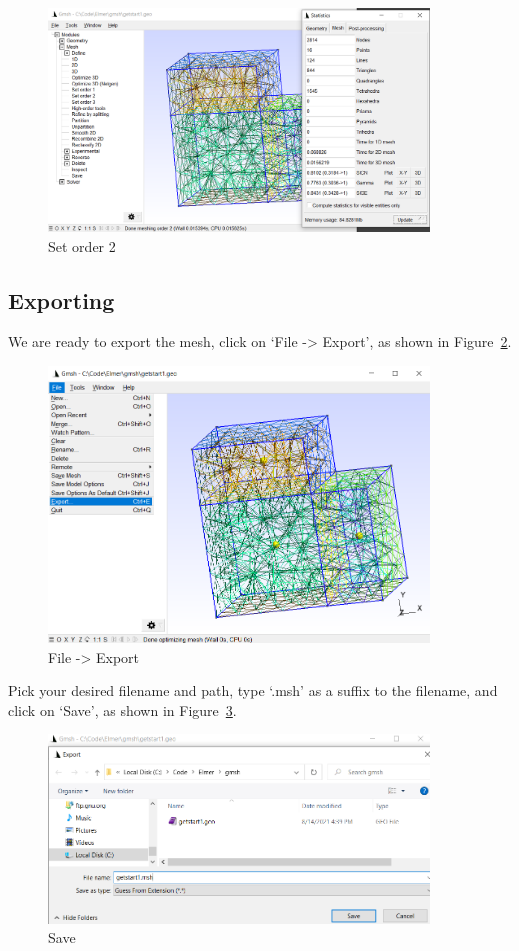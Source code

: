 \begin{figure}[H]
\centering
\includegraphics[width=0.9\textwidth]{gmsh-28}
\caption{Set order 2}\label{fg:gmsh-28}
\end{figure}

\subsection{Exporting}

We are ready to export the mesh, click on `File -> Export', as shown in Figure~\ref{fg:gmsh-29}.

\begin{figure}[H]
\centering
\includegraphics[width=0.9\textwidth]{gmsh-29}
\caption{File -> Export}\label{fg:gmsh-29}
\end{figure}

Pick your desired filename and path, type `.msh' as a suffix to the filename, and click on `Save', as shown in Figure~\ref{fg:gmsh-30}.

\begin{figure}[H]
\centering
\includegraphics[width=0.9\textwidth]{gmsh-30}
\caption{Save}\label{fg:gmsh-30}
\end{figure}

